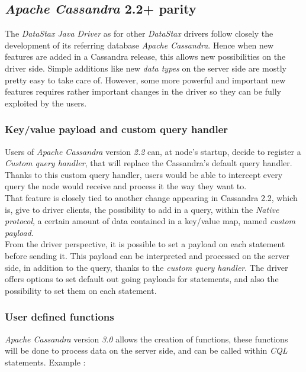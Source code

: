 \documentclass[a4paper]{report}
\newcommand{\djd}{\emph{DataStax Java Driver\xspace}}
\newcommand{\ca}{\emph{Apache Cassandra\xspace}}
\begin{document}
\subsection{\ca{} 2.2+ parity}
The \djd{} as for other \emph{DataStax} drivers follow closely the development of its referring database \ca{}. Hence when new features are added in a Cassandra release, this allows new possibilities on the driver side. Simple additions like new \emph{data types} on the server side are mostly pretty easy to take care of. However, some more powerful and important new features requires rather important changes in the driver so they can be fully exploited by the users.

\subsubsection{Key/value payload and custom query handler}
Users of \ca{} version \emph{2.2} can, at node's startup, decide to register a \emph{Custom query handler}, that will replace the Cassandra's default query handler. Thanks to this custom query handler, users would be able to intercept every query the node would receive and process it the way they want to. \\
That feature is closely tied to another change appearing in Cassandra 2.2, which is, give to driver clients, the possibility to add in a query, within the \emph{Native protocol}, a certain amount of data contained in a key/value map, named \emph{custom payload}.\\
From the driver perspective, it is possible to set a payload on each statement before sending it. This payload can be interpreted and processed on the server side, in addition to the query, thanks to the \emph{custom query handler}. The driver offers options to set default out going payloads for statements, and also the possibility to set them on each statement.

\subsubsection{User defined functions}
\ca{} version \emph{3.0} allows the creation of functions, these functions will be done to process data on the server side, and can be called within \emph{CQL} statements. Example : 
\end{document}
